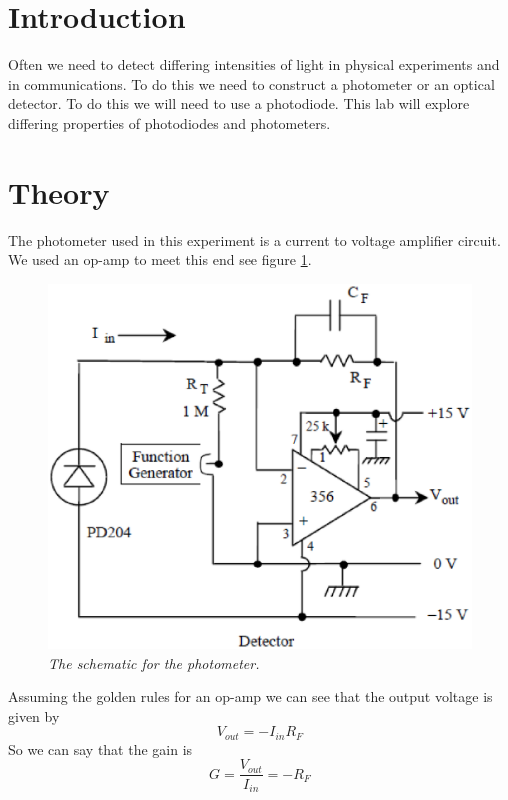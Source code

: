 \documentclass[11pt]{article}
\numberwithin{equation}{section}
\numberwithin{figure}{section}
\numberwithin{table}{section}
\begin{document}


\section{Introduction}
Often we need to detect differing intensities of light in physical experiments and in communications. To do this we need to construct a photometer or an optical detector. To do this we will need to use a photodiode. This lab will explore differing properties of photodiodes and photometers.

\section{Theory}
The photometer used in this experiment is a current to voltage amplifier circuit. We used an op-amp to meet this end see figure \ref{FigPhotoDetec}.
\begin{figure}[h]
\centering
\includegraphics[scale=0.75]{FigPhotoDetec.eps}
\caption{\textit{The schematic for the photometer.}}
\label{FigPhotoDetec}
\end{figure}
Assuming the golden rules for an op-amp we can see that the output voltage is given by
\begin{equation}
V_{out} = -I_{in}R_F
\label{OutVolt}
\end{equation}
So we can say that the gain is 
\begin{equation}
G = \frac{V_{out}}{I_{in}} = -R_F
\label{Gain}
\end{equation}
\end{document}
